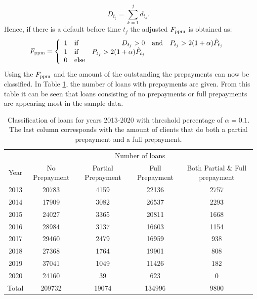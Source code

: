         \begin{equation}
            D_{t_j} = \displaystyle\sum_{k=1}^{j} d_{t_k}.
        \end{equation}
        Hence, if 
        there is a default before time $t_j$ the adjusted 
        $F_{\text{ppm}}$ is obtained as: 
        \begin{equation}
            F_{\text{ppm}} = \left\{
                \begin{array}{l l r l l }
                    1 & \text{if} & D_{t_j} > 0 & \text{and} &
                    P_{t_j} > 2(1 + \alpha) \hat{P}_{t_j} \\ 
                    1 & \text{if} & 
                    P_{t_j} > 2(1 + \alpha) \hat{P}_{t_j} \\ 
                    0 & \text{else}
                \end{array}
            \right.
        \end{equation}
        Using the $F_{\text{ppm}}$ and the amount of the outstanding
        the prepayments can now be classified.  
        In Table 
        \ref{model_classficationprepayment_table}, the number of 
        loans with prepayments are given. 
        From this table it can be seen that 
        loans consisting of no prepayments or full prepayments 
        are appearing most in the sample data.
        \begin{table}[H]
        \centering
            \begin{tabular}{c|c|c|c|c}
                & \multicolumn{4}{c}{Number of loans} \\
                Year&No Prepayment&Partial Prepayment&Full Prepayment &Both Partial \& Full prepayment  \\\hline
                2013 & 20783 & 4159 & 22136 & 2757\\
                2014 & 17909 & 3082 & 26537 & 2293\\
                2015 & 24027 & 3365 & 20811 & 1668 \\
                2016 & 28984 & 3137 & 16603 & 1154 \\
                2017 & 29460 & 2479 & 16959 & 938 \\
                2018 & 27368 & 1764 & 19901 & 808 \\
                2019 & 37041 & 1049 & 11426 & 182 \\
                2020 & 24160 & 39 & 623 & 0 \\\hline
                Total & 209732 & 19074 & 134996 & 9800
		    \end{tabular}
		    \caption{Classification of loans for years 2013-2020 with 
            threshold percentage of $\alpha = 0.1$. 
            The last column corresponds with the amount of 
            clients that do both a partial prepayment and a 
            full prepayment.}
		    \label{model_classficationprepayment_table}
        \end{table}
